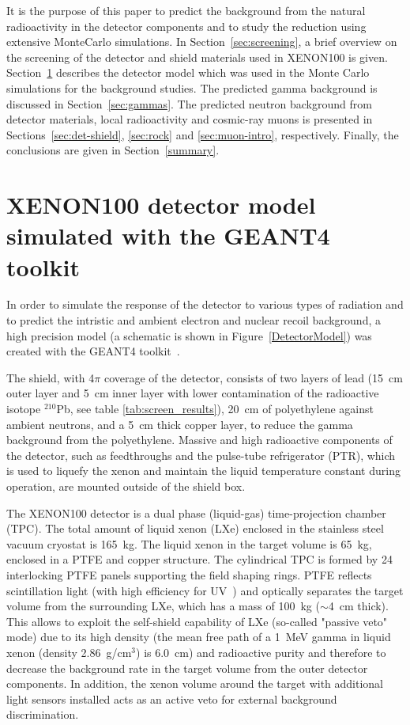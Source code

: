 It is the purpose of this paper to predict the background from the natural radioactivity in the detector components and to study the reduction using extensive MonteCarlo simulations.
In Section~\ref{sec:screening}, a brief overview on the screening
of the detector and shield materials used in XENON100 is given.
Section~\ref{sec:DetectorGeometry} describes the detector model which was used
in the Monte Carlo simulations for the background studies. The predicted gamma background is
discussed in Section~\ref{sec:gammas}. The predicted neutron background from
detector materials, local radioactivity and cosmic-ray muons is presented in
Sections~\ref{sec:det-shield}, \ref{sec:rock} and \ref{sec:muon-intro}, 
respectively. Finally, the conclusions are given in Section~\ref{summary}.


\section{XENON100 detector model simulated with the GEANT4 toolkit}
\label{sec:DetectorGeometry}

In order to simulate the response of the detector to various types of
radiation and to predict the intristic and ambient 
electron and nuclear recoil background, a high precision model (a schematic is
shown in Figure~\ref{DetectorModel}) was created with the GEANT4 toolkit~\cite{g4}.

The shield, with 4$\pi$ coverage of the detector, consists of two layers of lead 
(15~cm outer layer and 5~cm inner layer with lower contamination of the radioactive isotope 
${^{210}}$Pb, see table \ref{tab:screen_results}), 20~cm of polyethylene against ambient neutrons, and a 5~cm thick copper layer, to reduce the gamma background from the polyethylene.
Massive and high radioactive components of the detector, such as feedthroughs and the pulse-tube refrigerator (PTR), which is used to
liquefy the xenon and maintain the liquid temperature constant during operation, are mounted outside of the shield box.

The XENON100 detector is a dual phase (liquid-gas) time-projection chamber (TPC). The total 
amount of liquid xenon (LXe) enclosed in the stainless steel vacuum cryostat is 165~kg. The liquid 
xenon in the target volume is 65~kg, enclosed in a PTFE and copper structure. The cylindrical TPC is formed by 24 interlocking 
PTFE panels supporting the field shaping rings. PTFE reflects scintillation light (with high 
efficiency for UV~\cite{yamashita}) and optically separates the target volume from the surrounding 
LXe, which has a mass of 100~kg ($\sim$4~cm thick). This allows 
to exploit the self-shield capability of LXe (so-called "passive veto" mode) due to its high density (the mean free path of a 1~MeV gamma in liquid xenon (density 2.86~g/cm$^3$) is 6.0~cm) and radioactive
purity and therefore to decrease the background rate in the target volume from the outer detector 
components.
In addition, the xenon volume around the target with additional light sensors installed acts as an active veto for external background discrimination.

